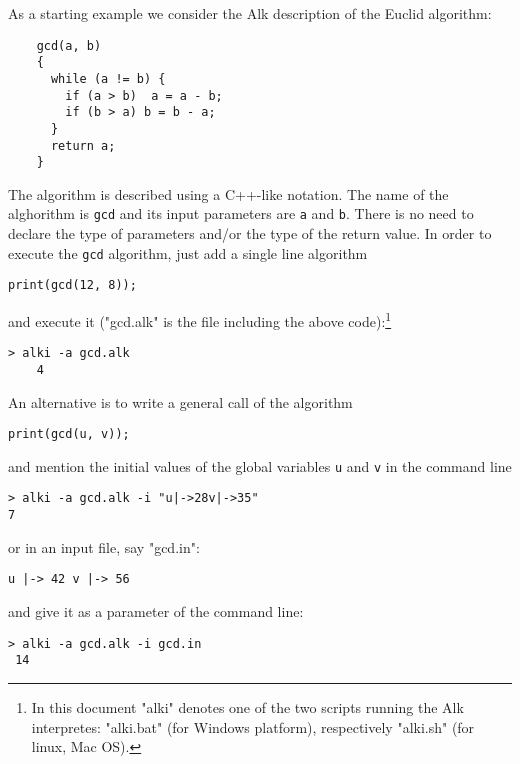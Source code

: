 \documentclass[a4paper]{report}
\begin{document}
As a starting example we consider the Alk description of the Euclid algorithm:
\begin{verbatim}
    gcd(a, b)
    {
      while (a != b) {
        if (a > b)  a = a - b;
        if (b > a) b = b - a;
      }
      return a;
    }
\end{verbatim}
The algorithm is described using a C++-like notation. The name of the alghorithm is \texttt{gcd} and its input parameters are \texttt{a} and \texttt{b}. There is no need to declare the type of parameters and/or the type of the return value.
In order to execute the \texttt{gcd} algorithm, just add a single line algorithm 
\begin{verbatim}
print(gcd(12, 8));
\end{verbatim}
and execute it ("gcd.alk" is the file including the above code):\footnote{In this document "alki" denotes one of the two scripts running the Alk interpretes: "alki.bat" (for Windows platform), respectively "alki.sh" (for linux, Mac OS).}
\begin{verbatim}
> alki -a gcd.alk 
    4
\end{verbatim}
An alternative is to write a general call of the algorithm
\begin{verbatim}
print(gcd(u, v));
\end{verbatim}
and mention the initial values of the global variables {\tt u} and {\tt v} in the command line
\begin{verbatim}
> alki -a gcd.alk -i "u|->28v|->35"
7
\end{verbatim}
or in an input file, say "gcd.in":
\begin{verbatim}
u |-> 42 v |-> 56
\end{verbatim}
and give it as a parameter of the command line:
\begin{verbatim}
> alki -a gcd.alk -i gcd.in
 14
\end{verbatim}
\end{document}
